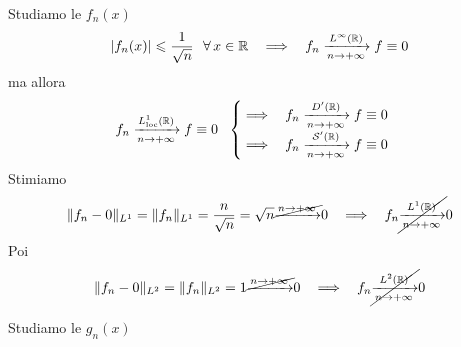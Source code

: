 Studiamo le $f_{n}(x)$
\begin{equation*}
| f_{n}(x)| \leqslant \frac{1}{\sqrt{n}} \ \ \forall x\in \RR  \ \ \implies \ \ f_{n}\xrightarrow[n\rightarrow + \infty ]{L^{\infty }(\RR)} f\equiv 0
\end{equation*}
ma allora
\begin{equation*}
f_{n}\xrightarrow[n\rightarrow + \infty ]{L^{1}_{\operatorname{loc}}(\mathbb{R})} f\equiv 0\ \ \begin{cases}
\implies \ \ f_{n}\xrightarrow[n\rightarrow + \infty ]{D'(\mathbb{R})} f\equiv 0\\
\implies \ \ f_{n}\xrightarrow[n\rightarrow + \infty ]{\mathcal{S}  '(\mathbb{R})} f\equiv 0
\end{cases}
\end{equation*}
Stimiamo
\begin{equation*}
\Vert f_{n} - 0\Vert _{L^{1}} = \Vert f_{n}\Vert _{L^{1}} = \frac{n}{\sqrt{n}} = \sqrt{n}\cancel{\xrightarrow{n\rightarrow + \infty }} 0\ \ \implies \ \ f_{n}\cancel{\xrightarrow[n\rightarrow + \infty ]{L^{1}(\RR)}} 0
\end{equation*}
Poi
\begin{equation*}
\Vert f_{n} - 0\Vert _{L^{2}} = \Vert f_{n}\Vert _{L^{2}} = 1\cancel{\xrightarrow{n\rightarrow + \infty }} 0\ \ \implies \ \ f_{n}\cancel{\xrightarrow[n\rightarrow + \infty ]{L^{2}(\RR)}} 0
\end{equation*}


Studiamo le $g_{n}(x)$


